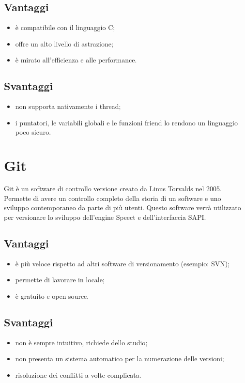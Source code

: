 \subsection*{Vantaggi}
\begin{itemize}
	\item è compatibile con il linguaggio C;
	\item offre un alto livello di astrazione;
	\item è mirato all'efficienza e alle performance.
\end{itemize}
\subsection*{Svantaggi}
\begin{itemize}
	\item non supporta nativamente i thread;
	\item i puntatori, le variabili globali e le funzioni friend lo rendono un linguaggio poco sicuro.~\cite{c++-advantages-disadvantages}
\end{itemize}
\section{Git}
Git è un software di controllo versione creato da Linus Torvalds nel 2005. Permette di avere un controllo completo della storia di un software e uno sviluppo contemporaneo da parte di più utenti.
Questo software verrà utilizzato per versionare lo sviluppo dell'engine Speect e dell'interfaccia SAPI.
\subsection*{Vantaggi}
\begin{itemize}
	\item è più veloce rispetto ad altri software di versionamento (esempio: SVN);
	\item permette di lavorare in locale;
	\item è gratuito e open source.~\cite{git-advantages-disadvantages}
\end{itemize}
\subsection*{Svantaggi}
\begin{itemize}
	\item non è sempre intuitivo, richiede dello studio;
	\item non presenta un sistema automatico per la numerazione delle versioni;
	\item risoluzione dei conflitti a volte complicata.
\end{itemize}
